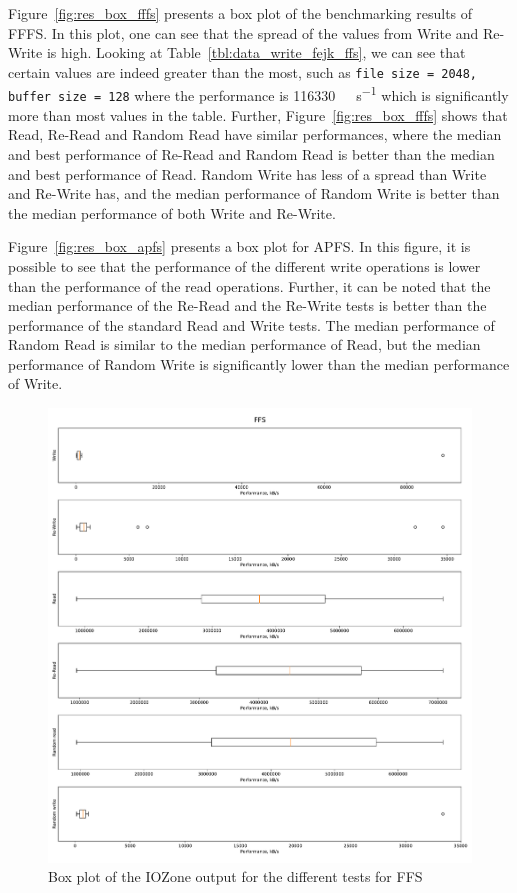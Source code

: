 Figure~\ref{fig:res_box_fffs} presents a box plot of the benchmarking results of \gls{FFFS}. In this plot, one can see that the spread of the values from Write and \mbox{Re-Write} is high. Looking at Table~\ref{tbl:data_write_fejk_ffs}, we can see that certain values are indeed greater than the most, such as \texttt{file size = 2048, buffer size = 128} where the performance is \SI[per-mode = symbol]{116330}{\kilo\byte\per\second} which is significantly more than most values in the table. Further, Figure~\ref{fig:res_box_fffs} shows that Read, \mbox{Re-Read} and Random Read have similar performances, where the median and best performance of \mbox{Re-Read} and Random Read is better than the median and best performance of Read. Random Write has less of a spread than Write and \mbox{Re-Write} has, and the median performance of Random Write is better than the median performance of both Write and \mbox{Re-Write}.

Figure~\ref{fig:res_box_apfs} presents a box plot for \gls{APFS}. In this figure, it is possible to see that the performance of the different write operations is lower than the performance of the read operations. Further, it can be noted that the median performance of the \mbox{Re-Read} and the \mbox{Re-Write} tests is better than the performance of the standard Read and Write tests. The median performance of Random Read is similar to the median performance of Read, but the median performance of Random Write is significantly lower than the median performance of Write.

\begin{figure}[!htb]
	\label{fig:res_box_ffs}
	\begin{center}
		\includegraphics[width=1.0\textwidth]{figures/benchmarking/ffs/FFS-box.pdf}
	\end{center}
	\caption{Box plot of the IOZone output for the different tests for \gls{FFS}}
\end{figure}

